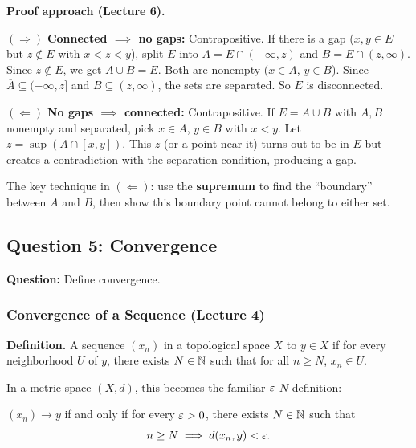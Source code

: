 \documentclass[../master/master.tex]{subfiles}
\begin{document}
\begin{notebox}
\textbf{Proof approach (Lecture 6).}

$(\Rightarrow)$ \textbf{Connected $\implies$ no gaps:} Contrapositive. If there is a gap ($x, y \in E$ but $z \notin E$ with $x < z < y$), split $E$ into $A = E \cap (-\infty, z)$ and $B = E \cap (z, \infty)$. Since $z \notin E$, we get $A \cup B = E$. Both are nonempty ($x \in A$, $y \in B$). Since $\overline{A} \subseteq (-\infty, z]$ and $B \subseteq (z, \infty)$, the sets are separated. So $E$ is disconnected.

$(\Leftarrow)$ \textbf{No gaps $\implies$ connected:} Contrapositive. If $E = A \cup B$ with $A, B$ nonempty and separated, pick $x \in A$, $y \in B$ with $x < y$. Let $z = \sup(A \cap [x,y])$. This $z$ (or a point near it) turns out to be in $E$ but creates a contradiction with the separation condition, producing a gap.

The key technique in $(\Leftarrow)$: use the \textbf{supremum} to find the ``boundary'' between $A$ and $B$, then show this boundary point cannot belong to either set.
\end{notebox}

\newpage
\subsection{Question 5: Convergence}

\begin{summarybox}
\textbf{Question:} Define convergence.
\end{summarybox}

\subsubsection*{Convergence of a Sequence (Lecture 4)}

\textbf{Definition.} A sequence $(x_n)$ in a topological space $X$  to $y \in X$ if for every neighborhood $U$ of $y$, there exists $N \in \mathbb{N}$ such that for all $n \geq N$, $x_n \in U$.

In a metric space $(X, d)$, this becomes the familiar $\varepsilon$-$N$ definition:

$(x_n) \to y$ if and only if for every $\varepsilon > 0$, there exists $N \in \mathbb{N}$ such that
\[
n \geq N \implies d(x_n, y) < \varepsilon.
\]
\end{document}
